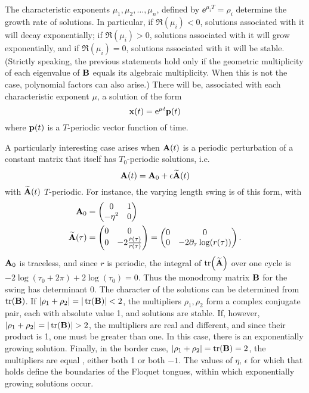The characteristic exponents  
$\mu_{1},\mu_{2},{\ldots},\mu_{n}$, defined by  $\ee^{\mu_{i}T}=\rho_{i}$ determine the
growth rate of solutions. In particular, if  $\Re(\mu_{i})<0$,
solutions associated with it will decay exponentially; if
$\Re(\mu_{i})>0$, solutions associated with it will grow
exponentially, and if  $\Re(\mu_{i})=0$, solutions 
associated with it will be stable. (Strictly speaking, the previous
statements hold only if the geometric multiplicity of each eigenvalue
of  $\vb{B}$ equals its algebraic multiplicity. When this is not the case,
polynomial factors can also arise.) There will be, associated with
each characteristic exponent  $\mu$, a solution of the form 
\begin{equation}
\vb{x}(t)=\mathrm{e}^{\mathit{\mu t}}\vb{p}(t)
\end{equation}
where  $\vb{p}(t)$ is a  $T$-periodic vector function of time. 

A particularly interesting case arises when  $\vb{A}(t)$ is a periodic
perturbation of a constant matrix that itself has 
${T}_{0}${}-periodic solutions, i.e.
\begin{equation}
\vb{A}(t)={\vb{A}}_{0}+\epsilon \widetilde{{\vb{A}}}(t)
\end{equation}
with  $\widetilde{{\vb{A}}}(t)$  $T${}-periodic. For instance, the varying
length swing is of this form, with
\begin{equation}
\begin{aligned}
\vb{A}_0&=
\begin{pmatrix}0&1\\-{\eta }^{2}&0\end{pmatrix}
\\
\widetilde{{\vb{A}}}(\tau)&=
\begin{pmatrix}0&0\\
0&-2\frac{\dot{{r}}(\tau)}{r(\tau)}
\end{pmatrix}
=
\begin{pmatrix}0&0\\
0&-2\partial_{\tau}\log(r(\tau))
\end{pmatrix}.
\end{aligned}
\end{equation}
${\vb{A}}_{0}$ is traceless, and since  $r$ is periodic, the integral of 
$\tr(\widetilde{{\vb{A}}})$ over one cycle is  
$-2\log({\tau}_{0}+2\pi )+2\log({\tau }_{0})=0$. Thus the
monodromy matrix  $\vb{B}$ for the swing has determinant 0. The character
of the solutions can be determined from  $\tr(\vb{B})$.
If  $\abs{\rho_{1}+\rho_{2}}=|\tr(\vb{B})|<2$, the multipliers  
$\rho_{1},\rho_{2}$ form a complex conjugate pair, each with absolute
value 1, and solutions are stable. If, however,
$\abs{\rho_{1}+\rho_{2}}=|\tr(\vb{B})|>2$, the multipliers
are real and different, and since their product is 1, one must be
greater than one. In this case, there is an exponentially growing
solution. Finally, in the border case,  $|\rho_{1}+\rho_{2}|=\tr(\vb{B})=2$, the multipliers are equal
, either both 1 or both  $-1$. The values of  $\eta,\,\epsilon $ for
which that holds define the boundaries of the Floquet tongues, within
which exponentially growing solutions occur. 





